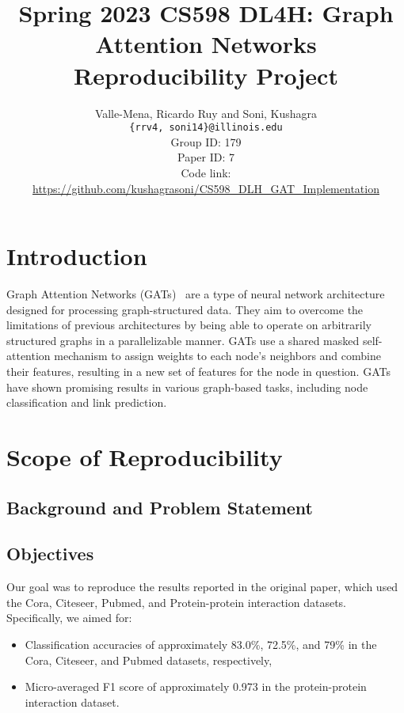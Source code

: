 \documentclass{article}
\title{Spring 2023 CS598 DL4H: Graph Attention Networks Reproducibility Project}
\author
{Valle-Mena, Ricardo Ruy and Soni, Kushagra \\
    \texttt{\{rrv4, soni14\}@illinois.edu}
    \\[2em]
    Group ID: 179\\
    Paper ID: 7\\
    Code link: \url{https://github.com/kushagrasoni/CS598_DLH_GAT_Implementation}
    \\[2em]
}
\begin{document}
    \maketitle
\section{Introduction}\label{sec:introduction}
    Graph Attention Networks (GATs)~\cite{velickovic2018graph} are a type of neural network architecture designed for
    processing graph-structured data.
    They aim to overcome the limitations of previous architectures by being able to operate on arbitrarily structured graphs in a parallelizable manner.
    GATs use a shared masked self-attention mechanism to assign weights to each node's neighbors and combine their features, resulting in a new set of features for the node in question.
    GATs have shown promising results in various graph-based tasks, including node classification and link prediction.

    \section{Scope of Reproducibility}\label{sec:scope-of-reproducibility}

    \subsection{Background and Problem Statement}\label{sec:background-and-problem-statement}
    

    \subsection{Objectives}\label{sec:objectives}
    Our goal was to reproduce the results reported in the original paper, which used the Cora, Citeseer, Pubmed, and Protein-protein interaction datasets. Specifically, we aimed for:
    \begin{itemize}
        \item Classification accuracies of approximately 83.0\%, 72.5\%, and 79\% in the Cora, Citeseer, and Pubmed
        datasets, respectively,
        \item Micro-averaged F1 score of approximately 0.973 in the protein-protein interaction dataset.
    \end{itemize}
\end{document}
